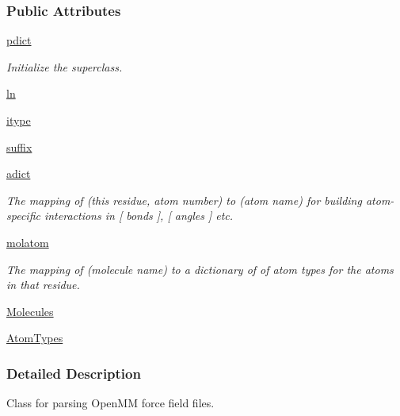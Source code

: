 \subsubsection*{Public Attributes}
\begin{DoxyCompactItemize}
\item 
\hyperlink{classforcebalance_1_1openmmio_1_1OpenMM__Reader_a4fa2da992c7f0f525dcc465ffba69b86}{pdict}
\begin{DoxyCompactList}\small\item\em Initialize the superclass. \end{DoxyCompactList}\item 
\hyperlink{classforcebalance_1_1basereader_1_1BaseReader_ab04436f3968d9bd6ec09238ee6537ec6}{ln}
\item 
\hyperlink{classforcebalance_1_1basereader_1_1BaseReader_a0c5b4d7b1c87dbcc9a8a0fdc82eee023}{itype}
\item 
\hyperlink{classforcebalance_1_1basereader_1_1BaseReader_ab2aba0f349b78cb3c1e11c35f56d6bdf}{suffix}
\item 
\hyperlink{classforcebalance_1_1basereader_1_1BaseReader_a84a513e0e43145b2fdaf38e73c32f83a}{adict}
\begin{DoxyCompactList}\small\item\em The mapping of (this residue, atom number) to (atom name) for building atom-\/specific interactions in \mbox{[} bonds \mbox{]}, \mbox{[} angles \mbox{]} etc. \end{DoxyCompactList}\item 
\hyperlink{classforcebalance_1_1basereader_1_1BaseReader_a56e6e6024825ada94ab24f5f3ce59851}{molatom}
\begin{DoxyCompactList}\small\item\em The mapping of (molecule name) to a dictionary of of atom types for the atoms in that residue. \end{DoxyCompactList}\item 
\hyperlink{classforcebalance_1_1basereader_1_1BaseReader_ad2842550aa690f1cd82e41ec8d6fe541}{Molecules}
\item 
\hyperlink{classforcebalance_1_1basereader_1_1BaseReader_ad5765e192499937376950410364014af}{Atom\-Types}
\end{DoxyCompactItemize}


\subsubsection{Detailed Description}
Class for parsing Open\-M\-M force field files. 



